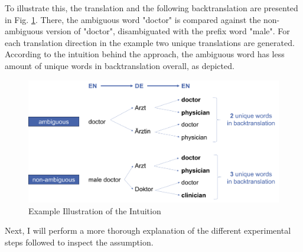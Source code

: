 To illustrate this, the translation and the following backtranslation are presented in Fig. \ref{fig:intuition}. There, the ambiguous word "doctor" is compared against the non-ambiguous version of "doctor", disambiguated with the prefix word "male". For each translation direction in the example two unique translations are generated. According to the intuition behind the approach, the ambiguous word has less amount of unique words in backtranslation overall, as depicted.

\begin{figure}
  \centering
  \includegraphics[scale=0.45]{figures/intuition.png}
  \caption{Example Illustration of the Intuition}
  \label{fig:intuition}
\end{figure}

Next, I will perform a more thorough explanation of the different experimental steps followed to inspect the assumption.



